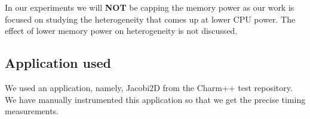 In our experiments we will \textbf{NOT} be capping the
memory power as our work is focused on studying the heterogeneity that comes up at
lower CPU power. The effect of lower memory power on heterogeneity is not
discussed.



\subsection{Application used}
We used an application, namely, Jacobi2D  from the
Charm++ test repository.  We have manually instrumented this application so that
we get the precise timing measurements.  

